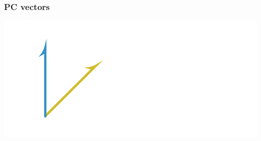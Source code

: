 \documentclass[20pt]{beamer}
\begin{document}
\begin{frame}
\frametitle{PC vectors}
\includegraphics[scale=1.5]{Figures/LexisStripped2.pdf}\\
\end{frame}
\end{document}
